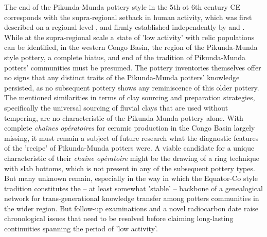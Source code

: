 \documentclass[smallextended,natbib]{svjour3}       %
\begin{document}
The end of the Pikunda-Munda pottery style in the 5th ot 6th century CE corresponds with the supra-regional setback in human activity, which was first described on a regional level \citet{Oslisly.1998}, and firmly established independently by \citet{deSaulieu.2021a} and \citet{Seidensticker.2021}. While at the supra-regional scale a state of 'low activity' with relic populations \citet[cf.][Fig. S4]{Seidensticker.2021} can be identified, in the western Congo Basin, the region of the Pikunda-Munda style pottery, a complete hiatus, and end of the tradition of Pikunda-Munda potters' communities must be presumed. The pottery inventories themselves offer no signs that any distinct traits of the Pikunda-Munda potters' knowledge persisted, as no subsequent pottery shows any reminiscence of this older pottery. The mentioned similarities in terms of clay sourcing and preparation strategies, specifically the universal sourcing of fluvial clays that are used without tempering, are no characteristic of the Pikunda-Munda pottery alone. With complete \textit{chaînes opératoires} for ceramic production in the Congo Basin largely missing, it must remain a subject of future research what the diagnostic features of the 'recipe' of Pikunda-Munda potters were. A viable candidate for a unique characteristic of their \textit{chaîne opératoire} might be the drawing of a ring technique with slab bottoms, which is not present in any of the subsequent pottery types. But many unknown remain, especially in the way in which the Equator-Co style tradition \citep{Wotzka.1995} constitutes the -- at least somewhat 'stable' -- backbone of a genealogical network for trans-generational knowledge transfer among potters communities in the wider region. But follow-up examinations \citep[193--204]{Seidensticker.2021e} and a novel radiocarbon date \citep[Tab.~2: RICH-30867]{Seidensticker.2024} raise chronological issues that need to be resolved before claiming long-lasting continuities spanning the period of 'low activity'.
\end{document}
